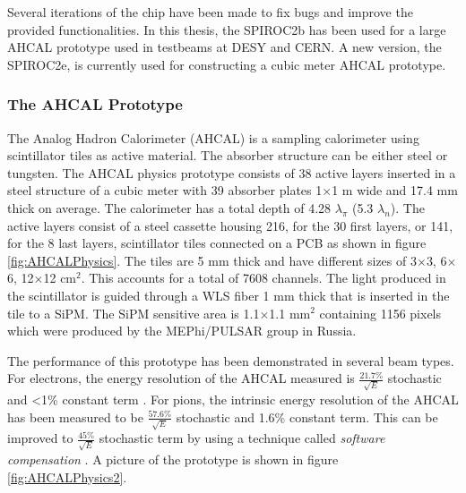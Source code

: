 Several iterations of the chip have been made to fix bugs and improve the provided functionalities. In this thesis, the SPIROC2b has been used for a large AHCAL prototype used in testbeams at DESY and CERN. A new version, the SPIROC2e, is currently used for constructing a cubic meter AHCAL prototype.

\subsubsection{The AHCAL Prototype}

The Analog Hadron Calorimeter (AHCAL) is a sampling calorimeter using scintillator tiles as active material. The absorber structure can be either steel or tungsten. The AHCAL physics prototype \cite{1748-0221-5-05-P05004} consists of 38 active layers inserted in a steel structure of a cubic meter with 39 absorber plates 1$\times$1 m wide and 17.4 mm thick on average. The calorimeter has a total depth of 4.28 $\lambda_{\pi}$ (5.3 $\lambda_{n}$). The active layers consist of a steel cassette housing 216, for the 30 first layers, or 141, for the 8 last layers, scintillator tiles connected on a PCB as shown in figure \ref{fig:AHCALPhysics}. The tiles are 5 mm thick and have different sizes of 3$\times$3, 6$\times$6, 12$\times$12 cm$^2$. This accounts for a total of 7608 channels. The light produced in the scintillator is guided through a WLS fiber 1 mm thick that is inserted in the tile to a SiPM. The SiPM sensitive area is 1.1$\times$1.1 mm$^2$ containing 1156 pixels which were produced by the MEPhi/PULSAR group in Russia.

The performance of this prototype has been demonstrated in several beam types. For electrons, the energy resolution of the AHCAL measured is $\frac{21.7\%}{\sqrt{E}}$ stochastic and <1\% constant term \cite{CAN034}. For pions, the intrinsic energy resolution of the AHCAL has been measured to be $\frac{57.6\%}{\sqrt{E}}$ stochastic and 1.6\% constant term. This can be improved to $\frac{45\%}{\sqrt{E}}$ stochastic term by using a technique called \textit{software compensation} \cite{SoftCompNew2012}. A picture of the prototype is shown in figure \ref{fig:AHCALPhysics2}.

